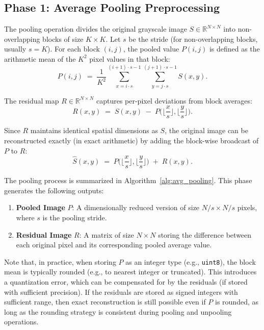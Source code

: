 \subsection{Phase 1: Average Pooling Preprocessing}

The pooling operation divides the original grayscale image \(S \in \mathbb{R}^{N \times N}\) into non-overlapping blocks of size \(K \times K\). Let \(s\) be the stride (for non-overlapping blocks, usually \(s = K\)). For each block \((i,j)\), the pooled value \(P(i,j)\) is defined as the arithmetic mean of the \(K^2\) pixel values in that block:
\begin{equation}
P(i,j)\;=\;\frac{1}{K^2}\sum_{x=i\cdot s}^{(i+1)\cdot s-1}\sum_{y=j\cdot s}^{(j+1)\cdot s-1} S(x,y).
\end{equation}

The residual map \(R\in\mathbb{R}^{N\times N}\) captures per-pixel deviations from block averages:
\begin{equation}
R(x,y)\;=\;S(x,y)\;-\;P\Big(\Big\lfloor\frac{x}{s}\Big\rfloor,\Big\lfloor\frac{y}{s}\Big\rfloor\Big).
\end{equation}

Since \(R\) maintains identical spatial dimensions as \(S\), the original image can be reconstructed exactly (in exact arithmetic) by adding the block-wise broadcast of \(P\) to \(R\):
\begin{equation}
\widehat{S}(x,y)\;=\;P\Big(\Big\lfloor\frac{x}{s}\Big\rfloor,\Big\lfloor\frac{y}{s}\Big\rfloor\Big)\;+\;R(x,y).
\end{equation}

The pooling process is summarized in Algorithm~\ref{alg:avg_pooling}. This phase generates the following outputs:

\begin{enumerate}
\item \textbf{Pooled Image} $P$: A dimensionally reduced version of size $N/s \times N/s$ pixels, where $s$ is the pooling stride.
\item \textbf{Residual Image} $R$: A matrix of size $N \times N$ storing the difference between each original pixel and its corresponding pooled average value.
\end{enumerate}

Note that, in practice, when storing \(P\) as an integer type (e.g., \texttt{uint8}), the block mean is typically rounded (e.g., to nearest integer or truncated). This introduces a quantization error, which can be compensated for by the residuals (if stored with sufficient precision). If the residuals are stored as signed integers with sufficient range, then exact reconstruction is still possible even if \(P\) is rounded, as long as the rounding strategy is consistent during pooling and unpooling operations.


